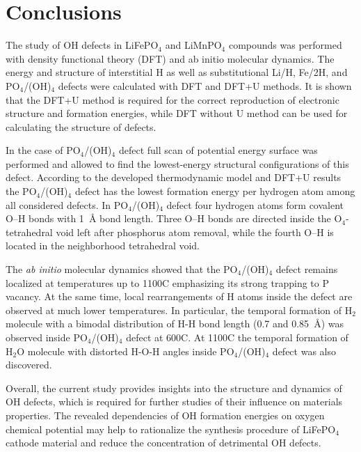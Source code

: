\chapter*{Conclusions}
The study of OH defects in LiFePO$_4$ and LiMnPO$_4$ compounds was performed with density functional theory (DFT) and ab initio molecular dynamics. The energy and structure of interstitial H as well as substitutional Li/H, Fe/2H, and PO$_4$/(OH)$_4$ defects were calculated with DFT and DFT+U methods. It is shown that the DFT+U method is required for the correct reproduction of electronic structure and formation energies, while DFT without U method can be used for calculating the structure of defects.

In the case of PO$_4$/(OH)$_4$ defect full scan of potential energy surface was performed and allowed to find the lowest-energy structural configurations of this defect.
According to the developed thermodynamic model and DFT+U results the PO$_4$/(OH)$_4$ defect has the lowest formation energy per hydrogen atom among all considered defects.
In PO$_4$/(OH)$_4$ defect four hydrogen atoms form covalent O--H bonds with 1~{\AA} bond length. Three O--H bonds are directed inside the O$_4$-tetrahedral void left after phosphorus atom removal, while the fourth O--H is located in the neighborhood tetrahedral void.

The \textit{ab initio} molecular dynamics showed that the PO$_4$/(OH)$_4$ defect remains localized at temperatures up to 1100\textdegree C emphasizing its strong trapping to P vacancy. At the same time, local rearrangements of H atoms inside the defect are observed at much lower temperatures. 
In particular, the temporal formation of H$_2$ molecule with a bimodal distribution of H-H bond length (0.7 and 0.85~{\AA}) was observed inside PO$_4$/(OH)$_4$ defect at 600\textdegree C. At 1100\textdegree C the temporal formation of H$_2$O molecule with distorted H-O-H angles inside PO$_4$/(OH)$_4$ defect was also discovered.

Overall, the current study provides insights into the structure and dynamics of OH defects, which is required for further studies of their influence on materials properties. The revealed dependencies of OH formation energies on oxygen chemical potential may help to rationalize the synthesis procedure of LiFePO$_4$ cathode material and reduce the concentration of detrimental OH defects. 



